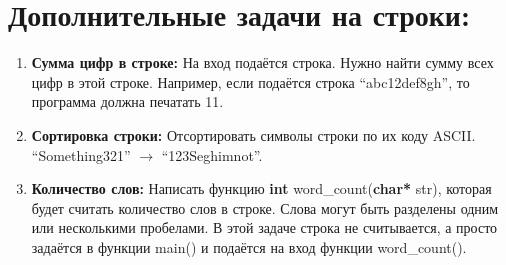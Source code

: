 \documentclass{article}
\begin{document}

\section*{Дополнительные задачи на строки:}
\begin{enumerate}
\item \textbf{Сумма цифр в строке:} На вход подаётся строка. Нужно найти сумму всех цифр в этой строке. Например, если подаётся строка ``abc12def8gh'', то программа должна печатать 11.
\item \textbf{Сортировка строки:} Отсортировать символы строки по их коду ASCII. ``Something321'' $\rightarrow$ ``123Seghimnot''.
\item \textbf{Количество слов:} Написать функцию \textbf{int} word\_count(\textbf{char*} str), которая будет считать количество слов в строке. Слова могут быть разделены одним или несколькими пробелами. В этой задаче строка не считывается, а просто задаётся в функции main() и подаётся на вход функции word\_count().
\end{enumerate}
\end{document}
